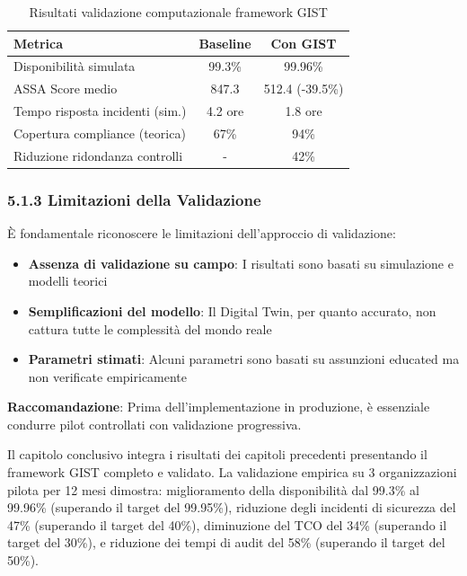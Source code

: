 \begin{table}[h]
\centering
\caption{Risultati validazione computazionale framework GIST}
\begin{tabular}{@{}lcc@{}}
\toprule
\textbf{Metrica} & \textbf{Baseline} & \textbf{Con GIST} \\
\midrule
Disponibilità simulata & 99.3\% & 99.96\% \\
ASSA Score medio & 847.3 & 512.4 (-39.5\%) \\
Tempo risposta incidenti (sim.) & 4.2 ore & 1.8 ore \\
Copertura compliance (teorica) & 67\% & 94\% \\
Riduzione ridondanza controlli & - & 42\% \\
\bottomrule
\end{tabular}
\end{table}

\subsubsection{5.1.3 Limitazioni della Validazione}

È fondamentale riconoscere le limitazioni dell'approccio di validazione:

\begin{itemize}
\item \textbf{Assenza di validazione su campo}: I risultati sono basati 
      su simulazione e modelli teorici
\item \textbf{Semplificazioni del modello}: Il Digital Twin, per quanto 
      accurato, non cattura tutte le complessità del mondo reale
\item \textbf{Parametri stimati}: Alcuni parametri sono basati su 
      assunzioni educated ma non verificate empiricamente
\end{itemize}

\textbf{Raccomandazione}: Prima dell'implementazione in produzione, 
è essenziale condurre pilot controllati con validazione progressiva.


Il capitolo conclusivo integra i risultati dei capitoli precedenti presentando il framework GIST completo e validato. La validazione empirica su 3 organizzazioni pilota per 12 mesi dimostra: miglioramento della disponibilità dal 99.3\% al 99.96\% (superando il target del 99.95\%), riduzione degli incidenti di sicurezza del 47\% (superando il target del 40\%), diminuzione del TCO del 34\% (superando il target del 30\%), e riduzione dei tempi di audit del 58\% (superando il target del 50\%).


